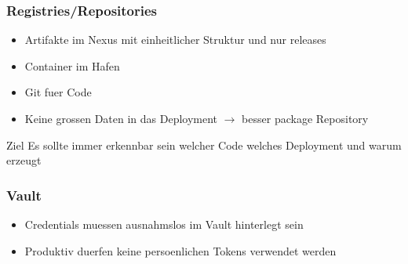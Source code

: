 \begin{frame}
    \frametitle{Registries/Repositories}
    \begin{itemize}
    \item Artifakte im Nexus mit einheitlicher Struktur und nur releases
    \item Container im Hafen
    \item Git fuer Code
    \item Keine grossen Daten in das Deployment $\rightarrow$ besser package Repository
    \end{itemize}
    \begin{block}{Ziel}
        Es sollte immer erkennbar sein welcher Code welches Deployment und warum erzeugt
    \end{block}
\end{frame}

\begin{frame}
    \frametitle{Vault}
    \begin{itemize}
    \item Credentials muessen ausnahmslos im Vault hinterlegt sein
    \item Produktiv duerfen keine persoenlichen Tokens verwendet werden
    \end{itemize}
\end{frame}
